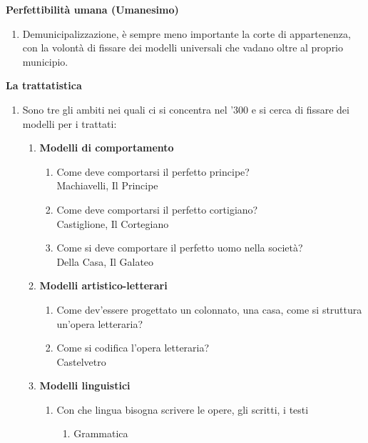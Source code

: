 \documentclass{article}
\begin{document}
\textbf{Perfettibilità umana (Umanesimo)}
\begin{enumerate}
    \item Demunicipalizzazione, è sempre meno importante la corte di appartenenza, con la volontà di fissare dei modelli universali che vadano oltre al proprio municipio.
\end{enumerate}

\textbf{La trattatistica}
\begin{enumerate}
    \item Sono tre gli ambiti nei quali ci si concentra nel '300 e si cerca di fissare dei modelli per i trattati:
        \begin{enumerate}
            \item \textbf{Modelli di comportamento}
                \begin{enumerate}
                    \item Come deve comportarsi il perfetto principe? \\
                        Machiavelli, Il Principe
                    \item Come deve comportarsi il perfetto cortigiano? \\
                        Castiglione, Il Cortegiano
                    \item Come si deve comportare il perfetto uomo nella società? \\
                        Della Casa, Il Galateo
                \end{enumerate}
            \item \textbf{Modelli artistico-letterari}
                \begin{enumerate}
                    \item Come dev'essere progettato un colonnato, una casa, come si struttura un'opera letteraria?
                    \item Come si codifica l'opera letteraria? \\
                        Castelvetro
                \end{enumerate}
            \item \textbf{Modelli linguistici}
                \begin{enumerate}
                    \item Con che lingua bisogna scrivere le opere, gli scritti, i testi
                        \begin{enumerate}
                            \item Grammatica \\

\end{enumerate}
\end{enumerate}
\end{enumerate}
\end{enumerate}
\end{document}
